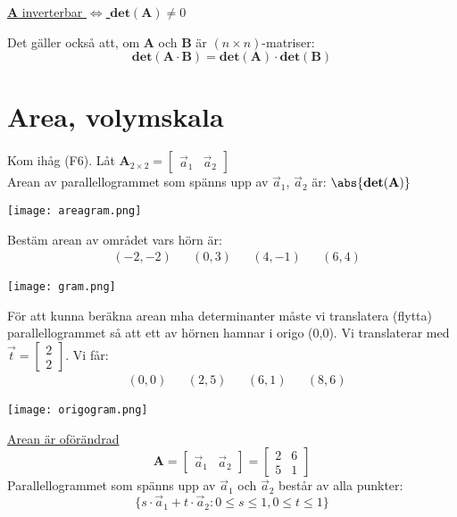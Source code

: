 \begin{center}
	\underline{\textbf{A} inverterbar $\Leftrightarrow$ $\mathbf{det}(\mathbf{A}) \neq 0$}
\end{center}
\newpage
\begin{sats}
	Det gäller också att, om \textbf{A} och \textbf{B} är $(n \times n)$-matriser:
	\[
	\mathbf{det}(\mathbf{A} \cdot \mathbf{B}) = \mathbf{det}(\mathbf{A}) \cdot \mathbf{det}(\mathbf{B})
	\]
\end{sats}
\section{Area, volymskala} %
\label{sec:area_volymskala}
Kom ihåg (F6). Låt $\mathbf{A}_{2 \times 2} = \begin{bmatrix} \vec{a}_1 & \vec{a}_2 \end{bmatrix}$\\
Arean av parallellogrammet som spänns upp av $\vec{a}_1$, $\vec{a}_2$ är: $\abs{\mathbf{det}(\mathbf{A})}$
\begin{center}
	\texttt{[image: areagram.png]}
\end{center}
\begin{Ex}
	Bestäm arean av området vars hörn är:
	\begin{align*}
	&(-2,-2)
	&&(0,3)
	&&(4,-1)
	&&(6,4)
	\end{align*}
	\begin{center}
		\texttt{[image: gram.png]}
	\end{center}
	För att kunna beräkna arean mha determinanter måste vi translatera (flytta) parallellogrammet så att ett av hörnen hamnar i origo (0,0).
	\newpage
	Vi translaterar med $\vec{t} = \begin{bmatrix} 2\\2 \end{bmatrix}$. Vi får:
	\begin{align*}
	&(0,0)
	&&(2,5)
	&&(6,1)
	&&(8,6)
	\end{align*}
	\begin{center}
		\texttt{[image: origogram.png]}
	\end{center}
	\underline{Arean är oförändrad}
	\[
	\mathbf{A} = \begin{bmatrix} \vec{a}_1&\vec{a}_2 \end{bmatrix} = \begin{bmatrix} 2&6\\5&1 \end{bmatrix}
	\]
	Parallellogrammet som spänns upp av $\vec{a}_1$ och $\vec{a}_2$ består av alla punkter:
	\[
	\{s \cdot \vec{a}_1 + t \cdot \vec{a}_2: 0 \le s \le 1, 0 \le t \le 1\}
	\]
\end{Ex}
